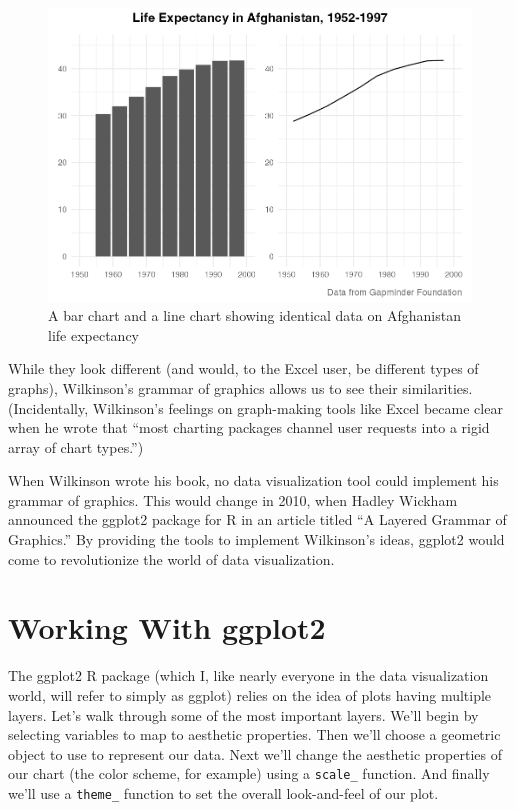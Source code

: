 \documentclass[
]{book}
\begin{document}
\begin{figure}
\includegraphics[width=1\linewidth]{data-viz_files/figure-latex/bar-line-chart-1} \caption{A bar chart and a line chart showing identical data on Afghanistan life expectancy}\label{fig:bar-line-chart}
\end{figure}

While they look different (and would, to the Excel user, be different types of graphs), Wilkinson's grammar of graphics allows us to see their similarities. (Incidentally, Wilkinson's feelings on graph-making tools like Excel became clear when he wrote that ``most charting packages channel user requests into a rigid array of chart types.'')

When Wilkinson wrote his book, no data visualization tool could implement his grammar of graphics. This would change in 2010, when Hadley Wickham announced the ggplot2 package for R in an article titled ``A Layered Grammar of Graphics.'' By providing the tools to implement Wilkinson's ideas, ggplot2 would come to revolutionize the world of data visualization.

\hypertarget{working-with-ggplot2}{%
\section*{Working With ggplot2}\label{working-with-ggplot2}}

The ggplot2 R package (which I, like nearly everyone in the data visualization world, will refer to simply as ggplot) relies on the idea of plots having multiple layers. Let's walk through some of the most important layers. We'll begin by selecting variables to map to aesthetic properties. Then we'll choose a geometric object to use to represent our data. Next we'll change the aesthetic properties of our chart (the color scheme, for example) using a \texttt{scale\_} function. And finally we'll use a \texttt{theme\_} function to set the overall look-and-feel of our plot.
\end{document}
